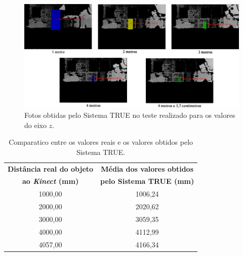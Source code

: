 
	\begin{figure}[htb]
		\begin{center}
			\includegraphics[scale=0.4]{figuras/5.Testes/eixoz-imgs2.png}
		\end{center}
		\caption{Fotos obtidas pelo Sistema TRUE no teste realizado para os valores do eixo $\displaystyle z$.}
		\label{fig:distancias}
	\end{figure}

		\begin{table}[h]
		\begin{center}
			\caption{Comparatico entre os valores reais e os valores obtidos pelo Sistema TRUE.}
			\label{tab:valores-z}
			\begin{tabular}{|c|c|}
				\hline \bf Distância real do objeto & \bf Média dos valores obtidos\\
							 \bf ao \textit{Kinect} (mm) & \bf pelo Sistema TRUE (mm)\\

				\hline
				\hline 1000,00 & 1006,24 \\ %
				\hline 2000,00 & 2020,62 \\ %
				\hline 3000,00 & 3059,35 \\ %
				\hline 4000,00 & 4112,99 \\ %
				\hline 4057,00 & 4166,34 \\ %
				\hline
			\end{tabular}
		\end{center}
	\end{table}

